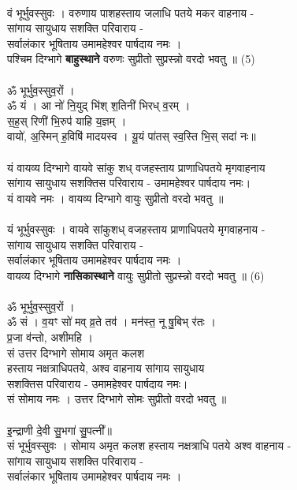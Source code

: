 \\
वं भूर्भुवस्सुवः । वरुणाय पाशहस्ताय जलाधि पतये मकर वाहनाय -\\
सांगाय सायुधाय सशक्ति परिवाराय -\\
सर्वालंकार भूषिताय उमामहेश्वर पार्षदाय नमः ।\\
पश्चिम दिग्भागे \textbf{बाहुस्थाने} वरुणः सुप्रीतो सुप्रस्न्नो वरदो भवतु ॥ (5)\\
\\
ॐ भूर्भुव॒स्सुव॒रों ।\\
{\small ॐ} यं । आ नो॑ नि॒युद् भि॑श् श॒तिनी॑ भिरध् व॒रम् । \\
स॒ह॒स् रिणी॑ भि॒रुप॑ याहि य॒ज्ञम् ।\\
वायो॑, अ॒स्मिन् ह॒विषि॑ मादयस्व । यू॒यं पा॑तस् स्व॒स्ति भि॒स् सदा॑ नः॥\\
\\
{\small यं वायव्य दिग्भागे वायवे सांकु शध् वजहस्ताय प्राणाधिपतये मृगवाहनाय\\
सांगाय सायुधाय सशक्तिस परिवाराय -  उमामहेश्वर पार्षदाय नमः।\\
यं वायवे नमः । वायव्य दिग्भागे  वायुः सुप्रीतो  वरदो भवतु ॥}\\
\\
यं भूर्भुवस्सुवः । वायवे सांकुशध् वजहस्ताय प्राणाधिपतये मृगवाहनाय -\\
सांगाय सायुधाय सशक्ति परिवाराय -\\
सर्वालंकार भूषिताय उमामहेश्वर पार्षदाय नमः ।\\
वायव्य दिग्भागे \textbf{नासिकास्थाने} वायुः सुप्रीतो सुप्रस्न्नो वरदो भवतु ॥ (6)\\
\\
ॐ भूर्भुव॒स्सुव॒रों ।\\
{\small ॐ} सं । व॒यꣳ सो॑ मव् व्र॒ते तव॑ । मन॑स्त॒ नू षु॒बिभ् र॑तः ।\\
प्र॒जा व॑न्तो, अशीमहि ।\\
{\small सं उत्तर दिग्भागे सोमाय अमृत कलश \\
हस्ताय नक्षत्राधिपतये, अश्व वाहनाय सांगाय सायुधाय \\
सशक्तिस परिवाराय - उमामहेश्वर पार्षदाय नमः।\\
सं सोमाय नमः । उत्तर दिग्भागे  सोमः सुप्रीतो वरदो भवतु ॥}\\
\\
इ॒न्द्राणी दे॒वी सु॒भगा॑ सु॒पत्नी᳚॥\\
सं भूर्भुवस्सुवः । सोमाय अमृत कलश हस्ताय नक्षत्राधि पतये अश्व वाहनाय -\\
सांगाय सायुधाय सशक्ति परिवाराय -\\
सर्वालंकार भूषिताय उमामहेश्वर पार्षदाय नमः ।\\
